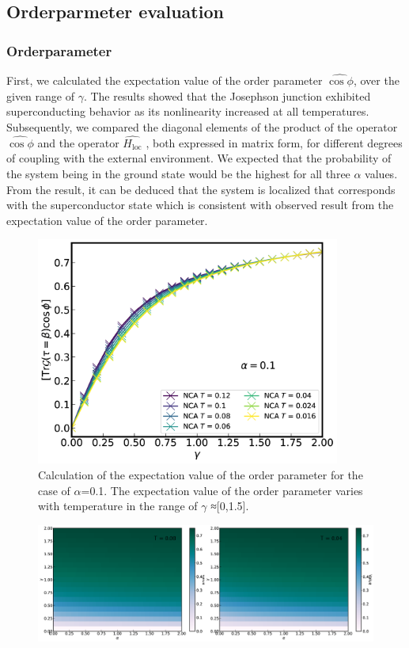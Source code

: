 \documentclass{article}[12pt]
\begin{document}
\begin{spacing}{1.5}
\subsection{Orderparmeter evaluation}
\subsubsection*{Orderparameter}
First, we calculated the expectation value of the order parameter $\hat{\cos\phi}$, 
over the given range of $\gamma$. The results showed that the Josephson junction exhibited superconducting behavior 
as its nonlinearity increased at all temperatures. Subsequently, we compared the diagonal elements of the product 
of the operator $\hat{\cos\phi}$ and the operator $\hat{H_{\text{loc}}}$ , both expressed in matrix form, 
for different degrees of coupling with the external environment. We expected that the probability of the system 
being in the ground state would be the highest for all three $\alpha$ values. From the result, 
it can be deduced that the system is localized that corresponds with the superconductor state which is consistent with observed
result from the expectation value of the order parameter.
\begin{figure}[htbp]
  \centerline{\includegraphics[width=10cm]{TexFigure/Expec_alp_0.1.png}}
  \caption{Calculation of the expectation value of the order parameter for the case of $\alpha$=0.1. 
  The expectation value of the order parameter varies with temperature in the range of $\gamma$ ≈[0,1.5].}
  \label{fig:Order1}
\end{figure}
\begin{figure}[htbp]
  \centerline{\includegraphics[width=16cm]{TexFigure/Order_color.png}}

\end{figure}
\end{spacing}
\end{document}
